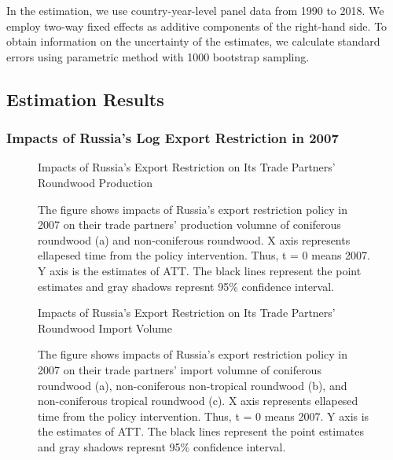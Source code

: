 \documentclass[a4paper,12pt]{article}
\begin{document}
In the estimation, we use country-year-level panel data from 1990 to 2018. We employ two-way fixed effects as additive components of the right-hand side. To obtain information on the uncertainty of the estimates, we calculate standard errors using parametric method with 1000 bootstrap sampling.

\subsection{Estimation Results}
\subsubsection*{Impacts of Russia's Log Export Restriction in 2007}

\begin{figure}[H] 
    \centering
    \caption{Impacts of Russia's Export Restriction on Its Trade Partners' Roundwood Production}
    \caption*{\small{The figure shows impacts of Russia's export restriction policy in 2007 on their trade partners' production volumne of coniferous roundwood (a) and non-coniferous roundwood. X axis represents ellapesed time from the policy intervention. Thus, t = 0 means 2007. Y axis is the estimates of ATT. The black lines represent the point estimates and gray shadows represnt 95\% confidence interval.}}
    \label{fig:att_prod_Russia}
\end{figure}

\begin{figure}[H] 
    \centering
    \caption{Impacts of Russia's Export Restriction on Its Trade Partners' Roundwood Import Volume}
    \caption*{\small{The figure shows impacts of Russia's export restriction policy in 2007 on their trade partners' import volumne of coniferous roundwood (a), non-coniferous non-tropical roundwood (b), and non-coniferous tropical roundwood (c). X axis represents ellapesed time from the policy intervention. Thus, t = 0 means 2007. Y axis is the estimates of ATT. The black lines represent the point estimates and gray shadows represnt 95\% confidence interval.}}
    \label{fig:att_imp_Russia}
\end{figure}
\end{document}

